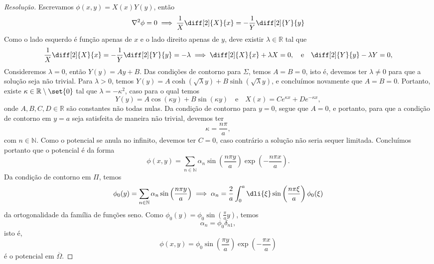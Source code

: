 \begin{proof}[Resolução]
    Escrevamos \(\phi(x, y) = X(x)Y(y)\), então
    \begin{equation*}
        \nabla^2\phi = 0 \implies \frac{1}{X}\diff[2]{X}{x} = -\frac{1}{Y}\diff[2]{Y}{y}
    \end{equation*}
    Como o lado esquerdo é função apenas de \(x\) e o lado direito apenas de \(y\), deve existir  \(\lambda \in \mathbb{R}\) tal que
    \begin{equation*}
        \frac{1}{X}\diff[2]{X}{x} = - \frac{1}{Y}\diff[2]{Y}{y} = -\lambda\implies \diff[2]{X}{x} + \lambda X = 0,\quad\text{e}\quad
        \diff[2]{Y}{y} - \lambda Y = 0,
    \end{equation*}
    Consideremos \(\lambda = 0\), então \(Y(y) = Ay + B\). Das condições de contorno para \(\Sigma\), temos \(A = B = 0\), isto é, devemos ter \(\lambda \neq 0\) para que a solução seja não trivial. Para \(\lambda > 0\), temos \(Y(y) = A \cosh(\sqrt{\lambda}y) + B \sinh(\sqrt{\lambda}y)\), e concluímos novamente que \(A = B = 0\). Portanto, existe \(\kappa \in \mathbb{R}\setminus\set{0}\) tal que \(\lambda = -\kappa^2\), caso para o qual temos
    \begin{equation*}
        Y(y) = A \cos(\kappa y) + B \sin(\kappa y)
        \quad\text{e}\quad
        X(x) = C e^{\kappa x} + D e^{-\kappa x},
    \end{equation*}
    onde \(A, B, C, D \in \mathbb{R}\) são constantes não todas nulas. Da condição de contorno para \(y = 0\), segue que \(A = 0\), e portanto, para que a condição de contorno em \(y = a\) seja satisfeita de maneira não trivial, devemos ter
    \begin{equation*}
        \kappa = \frac{n\pi}{a},
    \end{equation*}
    com \(n \in \mathbb{N}\). Como o potencial se anula no infinito, devemos ter \(C = 0\), caso contrário a solução não seria sequer limitada. Concluímos portanto que o potencial é da forma
    \begin{equation*}
        \phi(x,y) = \sum_{n \in \mathbb{N}} \alpha_n \sin\left(\frac{n \pi y}{a}\right) \exp\left(- \frac{n \pi x}{a}\right).
    \end{equation*}
    Da condição de contorno em \(\Pi\), temos
    \begin{equation*}
        \phi_0(y) = \sum_{n\in \mathbb{N}} \alpha_n \sin\left(\frac{n \pi y}{a}\right) \implies \alpha_n = \frac{2}{a}\int_0^a \dli{\xi} \sin\left(\frac{n \pi \xi}{a}\right) \phi_0(\xi)
    \end{equation*}
    da ortogonalidade da família de funções seno. Como \(\phi_0(y) = \phi_0\sin\left(\frac{\pi}{a}y\right)\), temos
    \begin{equation*}
        \alpha_n = \phi_0 \delta_{n1},
    \end{equation*}
    isto é,
    \begin{equation*}
        \phi(x,y) = \phi_0 \sin\left(\frac{\pi y}{a}\right)\exp\left(-\frac{\pi x}{a}\right)
    \end{equation*}
    é o potencial em \(\overline\Omega\).
\end{proof}

